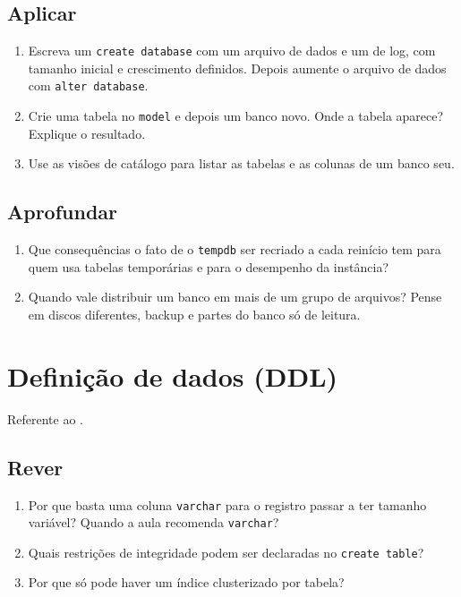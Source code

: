 \subsection*{Aplicar}
\begin{enumerate}
	\item Escreva um \texttt{create database} com um arquivo de dados e um
	de log, com tamanho inicial e crescimento definidos. Depois aumente o
	arquivo de dados com \texttt{alter database}.
	\item Crie uma tabela no \texttt{model} e depois um banco novo. Onde a
	tabela aparece? Explique o resultado.
	\item Use as visões de catálogo para listar as tabelas e as colunas de
	um banco seu.
\end{enumerate}

\subsection*{Aprofundar}
\begin{enumerate}
	\item Que consequências o fato de o \texttt{tempdb} ser recriado a cada
	reinício tem para quem usa tabelas temporárias e para o desempenho da
	instância?
	\item Quando vale distribuir um banco em mais de um grupo de arquivos?
	Pense em discos diferentes, backup e partes do banco só de leitura.
\end{enumerate}

\section{Definição de dados (DDL)}

Referente ao .

\subsection*{Rever}
\begin{enumerate}
	\item Por que basta uma coluna \texttt{varchar} para o registro passar
	a ter tamanho variável? Quando a aula recomenda \texttt{varchar}?
	\item Quais restrições de integridade podem ser declaradas no
	\texttt{create table}?
	\item Por que só pode haver um índice clusterizado por tabela?
\end{enumerate}

